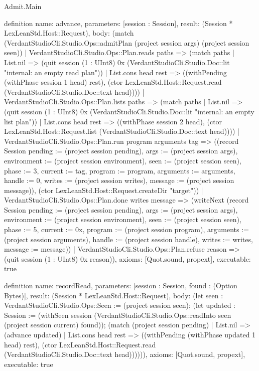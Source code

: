 \begin{lexlean}{Admit.Main}
\begin{semanticmodule}
definition{
  name: advance,
  parameters: [session : Session],
  result: (Session * LexLeanStd.Host::Request),
  body: (match (VerdantStudioCli.Studio.Ops::admitPlan (project session args) (project session seen))
    | VerdantStudioCli.Studio.Ops::Plan.reads paths => (match paths
      | List.nil => (quit session (1 : UInt8) 0x (VerdantStudioCli.Studio.Doc::lit "internal: an empty read plan\n"))
      | List.cons head rest => ((withPending (withPhase session 1 head) rest), (ctor LexLeanStd.Host::Request.read (VerdantStudioCli.Studio.Doc::text head))))
    | VerdantStudioCli.Studio.Ops::Plan.lists paths => (match paths
      | List.nil => (quit session (1 : UInt8) 0x (VerdantStudioCli.Studio.Doc::lit "internal: an empty list plan\n"))
      | List.cons head rest => ((withPhase session 2 head), (ctor LexLeanStd.Host::Request.list (VerdantStudioCli.Studio.Doc::text head))))
    | VerdantStudioCli.Studio.Ops::Plan.run program arguments tag => ((record Session {pending := (project session pending), args := (project session args), environment := (project session environment), seen := (project session seen), phase := 3, current := tag, program := program, arguments := arguments, handle := 0, writes := (project session writes), message := (project session message)}), (ctor LexLeanStd.Host::Request.createDir "target"))
    | VerdantStudioCli.Studio.Ops::Plan.done writes message => (writeNext (record Session {pending := (project session pending), args := (project session args), environment := (project session environment), seen := (project session seen), phase := 5, current := 0x, program := (project session program), arguments := (project session arguments), handle := (project session handle), writes := writes, message := message}))
    | VerdantStudioCli.Studio.Ops::Plan.refuse reason => (quit session (1 : UInt8) 0x reason)),
  axioms: [Quot.sound, propext],
  executable: true
}

definition{
  name: recordRead,
  parameters: [session : Session, found : (Option Bytes)],
  result: (Session * LexLeanStd.Host::Request),
  body: (let seen : VerdantStudioCli.Studio.Ops::Seen := (project session seen); (let updated : Session := (withSeen session (VerdantStudioCli.Studio.Ops::readInto seen (project session current) found)); (match (project session pending)
    | List.nil => (advance updated)
    | List.cons head rest => ((withPending (withPhase updated 1 head) rest), (ctor LexLeanStd.Host::Request.read (VerdantStudioCli.Studio.Doc::text head)))))),
  axioms: [Quot.sound, propext],
  executable: true
}


\end{semanticmodule}
\end{lexlean}
